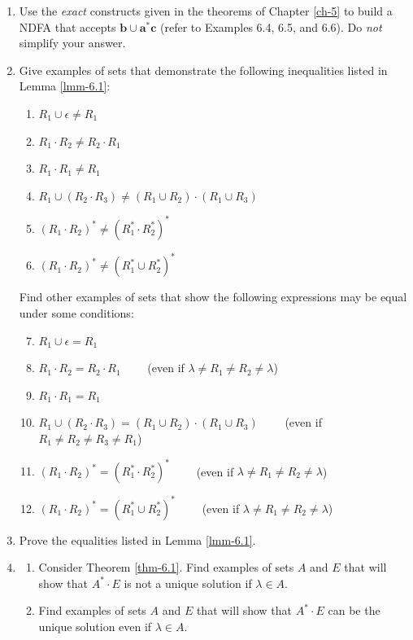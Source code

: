 \begin{enumerate}[{6.}1.]
\item Use the \emph{exact} constructs given in the theorems of Chapter \ref{ch-5} to build a
NDFA that accepts $\pmb{b}\cup\pmb{a}^*\pmb{c}$ (refer to Examples 6.4,
6.5, and 6.6). Do \emph{not} simplify your answer.

\item Give examples of sets that demonstrate the following inequalities listed
in Lemma \ref{lmm-6.1}:
\begin{enumerate}
\item $R_1 \cup \epsilon \neq R_1$
\item $R_1 \cdot R_2 \not= R_2 \cdot R_1$
\item $R_1 \cdot R_1 \not= R_1$
\item $R_1 \cup (R_2 \cdot R_3) \not= (R_1 \cup R_2)\cdot(R_1 \cup R_3)$
\item $(R_1 \cdot R_2)^* \not= (R^*_1 \cdot R^*_2)^*$
\item $(R_1 \cdot R_2)^* \not= (R^*_1 \cup R^*_2)^*$
\end{enumerate}
Find other examples of sets that show the following expressions may be equal
under some conditions:
\begin{enumerate}
\setcounter{enumii}{6}
\item $R_1 \cup \epsilon = R_1$
\item $R_1 \cdot R_2 = R_2 \cdot R_1\qquad$ (even if $\lambda \neq R_1 \neq R_2 \neq \lambda$)
\item $R_1 \cdot R_1 = R_1$
\item $R_1 \cup (R_2 \cdot R_3) = (R_1 \cup R_2)\cdot(R_1 \cup R_3)\qquad$
	(even if $R_1 \not= R_2 \not= R_3 \not= R_1$)
\item $(R_1 \cdot R_2)^* = (R^*_1 \cdot R^*_2)^*\qquad$
(even if $\lambda \neq R_1 \neq R_2 \neq \lambda$)
\item $(R_1 \cdot R_2)^* = (R^*_1 \cup R^*_2)^*\qquad$
(even if $\lambda \neq R_1 \neq R_2 \neq \lambda$)
\end{enumerate}

\item Prove the equalities listed in Lemma \ref{lmm-6.1}.

\item \begin{enumerate}
\item Consider Theorem \ref{thm-6.1}. Find examples of sets $A$ and $E$ that will show
that $A^*  \cdot E$ is not a unique solution if $\lambda \in A$.
\item Find examples of sets $A$ and $E$ that will show that $A^*  \cdot E$ can be
the unique solution even if $\lambda \in A$.
\end{enumerate}


\end{enumerate}
